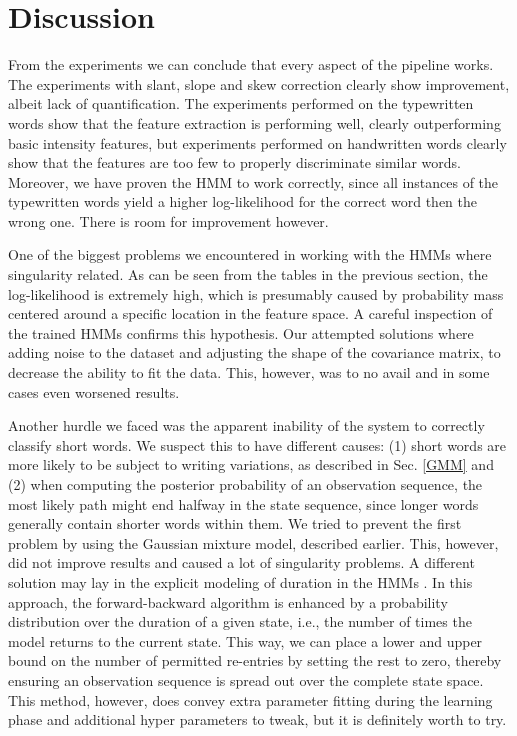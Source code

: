 \documentclass[conference]{IEEEtran}
\begin{document}
\section{Discussion} \label{discussion}
From the experiments we can conclude that every aspect of the pipeline works. The experiments with slant, slope and skew correction clearly show improvement, albeit lack of quantification. The experiments performed on the typewritten words show that the feature extraction is performing well, clearly outperforming basic intensity features, but experiments performed on handwritten words clearly show that the features are too few to properly discriminate similar words. Moreover, we have proven the HMM to work correctly, since all instances of the typewritten words yield a higher log-likelihood for the correct word then the wrong one. There is room for improvement however.

One of the biggest problems we encountered in working with the HMMs where singularity related. As can be seen from the tables in the previous section, the log-likelihood is extremely high, which is presumably caused by probability mass centered around a specific location in the feature space. A careful inspection of the trained HMMs confirms this hypothesis. Our attempted solutions where adding noise to the dataset and adjusting the shape of the covariance matrix, to decrease the ability to fit the data. This, however, was to no avail and in some cases even worsened results.

Another hurdle we faced was the apparent inability of the system to correctly classify short words. We suspect this to have different causes: (1) short words are more likely to be subject to writing variations, as described in Sec. \ref{GMM} and (2) when computing the posterior probability of an observation sequence, the most likely path might end halfway in the state sequence, since longer words generally contain shorter words within them. We tried to prevent the first problem by using the Gaussian mixture model, described earlier. This, however, did not improve results and caused a lot of singularity problems. A different solution may lay in the explicit modeling of duration in the HMMs \cite{conf/tsd/TothK05}\cite{journals/tsp/YuK06}. In this approach, the forward-backward algorithm is enhanced by a probability distribution over the duration of a given state, i.e., the number of times the model returns to the current state. This way, we can place a lower and upper bound on the number of permitted re-entries by setting the rest to zero, thereby ensuring an observation sequence is spread out over the complete state space. This method, however, does convey extra parameter fitting during the learning phase and additional hyper parameters to tweak, but it is definitely worth to try.
\end{document}
